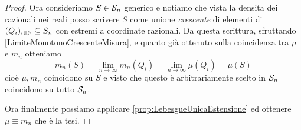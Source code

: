 \begin{proof}
	Ora consideriamo $S\in\S_n$ generico e notiamo che vista la densita dei razionali nei reali posso scrivere $S$ come unione \emph{crescente} di elementi di $(Q_i)_{i\in\N}\subseteq S_n$ con estremi a coordinate razionali. 
	Da questa scrittura, sfruttando \cref{LimiteMonotonoCrescenteMisura}, e quanto già ottenuto sulla coincidenza tra $\mu$ e $m_n$ otteniamo
	\begin{equation*}
		m_n(S)=\lim_{n\to\infty}m_n(Q_i)=\lim_{n\to\infty}\mu(Q_i)=\mu(S)
	\end{equation*}
	cioè $\mu,m_n$ coincidono su $S$ e visto che questo è arbitrariamente scelto in $\S_n$ coincidono su tutto $\S_n$.
	
	Ora finalmente possiamo applicare \cref{prop:LebesgueUnicaEstensione} ed ottenere $\mu\equiv m_n$ che è la tesi.
\end{proof}

